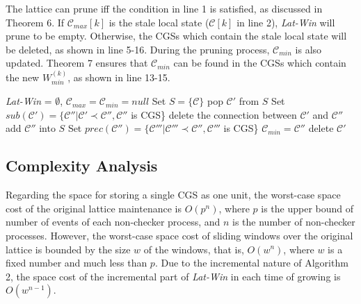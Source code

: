 \documentclass[12pt,journal,letterpaper,compsoc]{IEEEtran}
\begin{document}
The lattice can prune iff the condition in line 1 is satisfied, as discussed in Theorem 6. If $\mathcal{C}_{max}[k]$ is the stale local state ($\mathcal{C}[k]$ in line 2), {\it Lat-Win} will prune to be empty. Otherwise, the CGSs which contain the stale local state will be deleted, as shown in line 5-16. During the pruning process, $\mathcal{C}_{min}$ is also updated. Theorem 7 ensures that $\mathcal{C}_{min}$ can be found in the CGSs which contain the new $W^{(k)}_{min}$, as shown in line 13-15.

\begin{algorithm}[htbp]
\SetAlgoVlined
{}
{
    {
        {\it Lat-Win} = $\emptyset$, $\mathcal{C}_{max} = \mathcal{C}_{min} = null$\;
    }
    {
        Set $S = \{\mathcal{C}\}$\;
        {
            pop $\mathcal{C}'$ from $S$\;
            Set $sub(\mathcal{C}') = \{\mathcal{C}''|\mathcal{C}'\prec\mathcal{C}'', \mathcal{C}''$ is CGS\}\;
            {
                delete the connection between $\mathcal{C}'$ and $\mathcal{C}''$\;
                {
                    add $\mathcal{C}''$ into $S$\;
                }
                {
                    Set $prec(\mathcal{C}'') = \{\mathcal{C}'''|\mathcal{C}'''\prec\mathcal{C}'', \mathcal{C}'''$ is CGS\} 
                    {
                        $\mathcal{C}_{min} = \mathcal{C}''$\;
                    }
                }
            }
            delete $\mathcal{C}'$\;
        }
    }
}
\caption{$prune\_lattice(\mathcal{C},k)$\label{A:prune_lattice(C,k)}}
\end{algorithm}

\subsection{Complexity Analysis}
\label{sec:complexity analysis}

Regarding the space for storing a single CGS as one unit, the worst-case space cost of the original lattice maintenance is $O(p^n)$, where $p$ is the upper bound of number of events of each non-checker process, and $n$ is the number of non-checker processes. However, the worst-case space cost of sliding windows over the original lattice is bounded by the size $w$ of the windows, that is, $O(w^n)$, where $w$ is a fixed number and much less than $p$. Due to the incremental nature of Algorithm 2, the space cost of the incremental part of {\it Lat-Win} in each time of growing is $O(w^{n-1})$.
\end{document}

